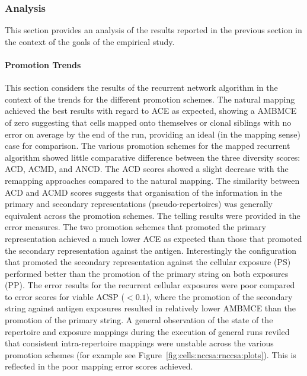 %
%
\subsubsection{Analysis}
This section provides an analysis of the results reported in the previous section in the context of the goals of the empirical study. 

%
%
\paragraph{Promotion Trends}
This section considers the results of the recurrent network algorithm in the context of the trends for the different promotion schemes.
The natural mapping achieved the best results with regard to ACE as expected, showing a AMBMCE of zero suggesting that cells mapped onto themselves or clonal siblings with no error on average by the end of the run, providing an ideal (in the mapping sense) case for comparison.
The various promotion schemes for the mapped recurrent algorithm showed little comparative difference between the three diversity scores: ACD, ACMD, and ANCD. The ACD scores showed a slight decrease with the remapping approaches compared to the natural mapping. The similarity between ACD and ACMD scores suggests that organisation of the information in the primary and secondary representations (pseudo-repertoires) was generally equivalent across the promotion schemes.
The telling results were provided in the error measures. The two promotion schemes that promoted the primary representation achieved a much lower ACE as expected than those that promoted the secondary representation against the antigen. Interestingly the configuration that promoted the secondary representation against the cellular exposure (PS) performed better than the promotion of the primary string on both exposures (PP). 
The error results for the recurrent cellular exposures were poor compared to error scores for viable ACSP ($<0.1$), where the promotion of the secondary string against antigen exposures resulted in relatively lower AMBMCE than the promotion of the primary string. 
A general observation of the state of the repertoire and exposure mappings during the execution of general runs reviled that consistent intra-repertoire mappings were unstable across the various promotion schemes (for example see Figure~\ref{fig:cells:nccsa:rnccsa:plots}). This is reflected in the poor mapping error scores achieved.

